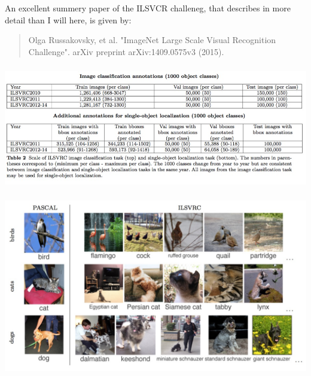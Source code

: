 \documentclass[xetex,mathserif,serif,aspectratio=169]{beamer}
\begin{document}
\begin{frame}[fragile] \frametitle{} \oldB \small


An excellent summery paper of the ILSVCR challeneg, that
describes in more detail than I will here, is given by:
\begin{quote}
Olga Russakovsky, et al. "ImageNet Large Scale Visual Recognition Challenge".
arXiv preprint arXiv:1409.0575v3 (2015).
\end{quote}

\end{frame}

\begin{frame}[fragile] \frametitle{} \oldB \small

\begin{center}
\includegraphics[width=\textwidth]{img/ilsvrcSize.jpg}
\end{center}

\end{frame}


\begin{frame}[fragile] \frametitle{} \oldB \small

\begin{center}
\includegraphics[width=\textwidth]{img/ilsvrcCategories.jpg}
\end{center}

\end{frame}
\end{document}
